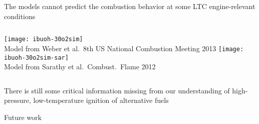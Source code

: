 \documentclass{beamer}
\begin{document}
\begin{frame}{The models cannot predict the combustion behavior at some LTC engine-relevant conditions}
    \begin{columns}
            \centering
            \texttt{[image: ibuoh-30o2sim]}\\
            Model from Weber et al.\ 8th US National Combustion Meeting 2013
            \centering
            \texttt{[image: ibuoh-30o2sim-sar]}\\
            Model from Sarathy et al.\ Combust.\ Flame 2012
    \end{columns}
    \vspace{0.5cm}
    \begin{center}
        There is still some critical information missing from our
        understanding of high-pressure, low-temperature ignition
        of alternative fuels
    \end{center}
\end{frame}

\begin{frame}{Future work}
\end{frame}
\end{document}
